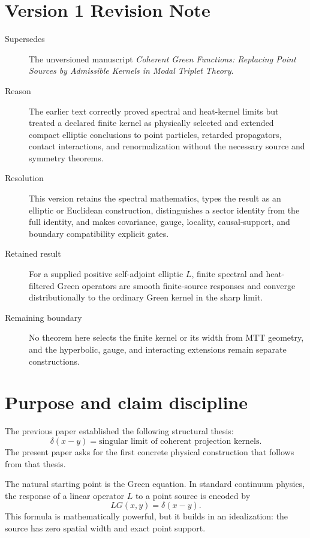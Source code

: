 \documentclass[11pt]{article}
\begin{document}
\section*{Version 1 Revision Note}
\begin{description}
\item[Supersedes] The unversioned manuscript
\emph{Coherent Green Functions: Replacing Point Sources by Admissible
Kernels in Modal Triplet Theory}.
\item[Reason] The earlier text correctly proved spectral and heat-kernel
limits but treated a declared finite kernel as physically selected and
extended compact elliptic conclusions to point particles, retarded
propagators, contact interactions, and renormalization without the necessary
source and symmetry theorems.
\item[Resolution] This version retains the spectral mathematics, types the
result as an elliptic or Euclidean construction, distinguishes a sector
identity from the full identity, and makes covariance, gauge, locality,
causal-support, and boundary compatibility explicit gates.
\item[Retained result] For a supplied positive self-adjoint elliptic \(L\),
finite spectral and heat-filtered Green operators are smooth finite-source
responses and converge distributionally to the ordinary Green kernel in the
sharp limit.
\item[Remaining boundary] No theorem here selects the finite kernel or its
width from MTT geometry, and the hyperbolic, gauge, and interacting
extensions remain separate constructions.
\end{description}

\tableofcontents

\section{Purpose and claim discipline}

The previous paper established the following structural thesis:
\[
\delta(x-y)=\text{singular limit of coherent projection kernels}.
\]
The present paper asks for the first concrete physical construction that follows from that thesis.

The natural starting point is the Green equation. In standard continuum physics, the response of a linear operator \(L\) to a point source is encoded by
\begin{equation}
LG(x,y)=\delta(x-y).
\end{equation}
This formula is mathematically powerful, but it builds in an idealization: the source has zero spatial width and exact point support.
\end{document}

